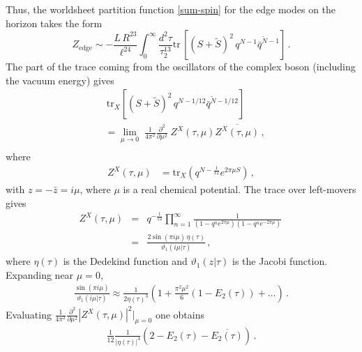 \documentclass[aps,prl, reprint, superscriptaddress, 10pt]{revtex4-2}
\newcommand{\1}{\textbf{1}}
\newcommand{\tr}{\mbox{tr}}
\newcommand{\+}{{\,+ \,}}
\begin{document}
Thus, the worldsheet partition function \eqref{sum-spin} for the edge modes on the horizon takes the form
\begin{equation}\label{edge-one}
	Z_{\text{edge}} \sim -\frac{L\,R^{23}}{ \ell^{ 24} } \int_0^\infty \frac{d^2\tau}{\tau_2^{13}} \tr{}\,\left[ (S+ \tilde{S})^2 \, q^{ N-1} \bar{q}^{\tilde{N} -1} \right]\, .
\end{equation}
The part of the trace coming from the oscillators of the complex boson (including the vacuum energy) gives
\begin{equation}
\begin{split}
	& \, \tr_X \left[ (S + \tilde{S})^2 \, q^{ N-1/12} \bar{q}^{\tilde{N} -1/12} \right] \\

	&= \lim_{\mu\rightarrow 0} \; \frac{1}{4\pi^2 } \frac{\partial^2}{\partial \mu^2} \; Z^X(\tau,\mu) \overline{Z^X(\tau, \mu)} \, , \\
\end{split}
\end{equation}
where
\begin{equation}
\begin{split}
	Z^X(\tau,\mu) &= \tr_X \left( q^{N - \frac{1}{12} } e^{2\pi \mu S }\right) \, ,
	\end{split}
\end{equation}
with $z= -\bar{z}= i \mu$, where $\mu$ is a real chemical potential. The trace over left-movers gives
\begin{eqnarray}
	Z^X(\tau,\mu) &=& q^{-\frac{1}{12}}\prod_{n=1}^{\infty}
	\frac{1}{(1 - q^n e^{2\pi \mu})(1 - q^n e^{-2\pi \mu})} \, \nonumber\\
	&=&\frac{2 \sin(\pi i \mu)\, \eta(\tau) }
	{\vartheta_1(i \mu|\tau)} \, ,
\end{eqnarray}
where $\eta(\tau)$ is the Dedekind function and $\vartheta_1(z|\tau)$ is the Jacobi function. Expanding near $\mu = 0$,
\begin{equation}
\begin{split}
	\frac{\sin(\pi i\mu) }
	 {\vartheta_1(i\mu|\tau)}
	\approx \frac{1}{2 \eta(\tau)^3 } \left( 1 + \frac{ \pi^2 \mu^2}{6}\left( 1 - E_2(\tau) \right) + \ldots \right) \, .
\end{split}
\end{equation}
Evaluating $\frac{1}{4\pi^2 } \frac{\partial^2}{\partial \mu^2} \left| Z^X(\tau,\mu)\right|^2 \bigg|_{\mu=0}$ one obtains
\begin{equation} \label{E2expression}
\begin{split}
	\frac{1}{12} \frac{1}{ |\eta(\tau)|^4 } \left( 2 - E_2(\tau) - \overline{E_2(\tau)} \right) \, .
\end{split}
\end{equation}
\end{document}
